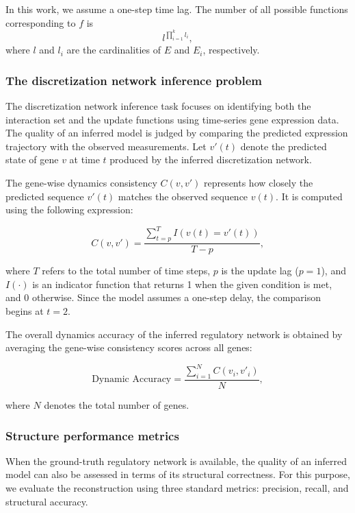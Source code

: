 In this work, we assume a one-step time lag. The number of all possible functions corresponding to \( f \) is 
\[
l^{\prod_{i=1}^{k} l_i},
\] 
where \( l \) and \( l_i \) are the cardinalities of \( E \) and \( E_i \), respectively.



\subsubsection{The discretization network inference problem}

The discretization network inference task focuses on identifying both the interaction set and the update functions using time-series gene expression data. The quality of an inferred model is judged by comparing the predicted expression trajectory with the observed measurements. Let \( v'(t) \) denote the predicted state of gene \( v \) at time \( t \) produced by the inferred discretization network.

The gene-wise dynamics consistency \( C(v, v') \) represents how closely the predicted sequence \( v'(t) \) matches the observed sequence \( v(t) \). It is computed using the following expression:

\[
C(v, v') = \frac{\sum_{t=p}^{T} I(v(t) = v'(t))}{T - p},
\]

where \( T \) refers to the total number of time steps, \( p \) is the update lag (\( p = 1 \)), and \( I(\cdot) \) is an indicator function that returns 1 when the given condition is met, and 0 otherwise. Since the model assumes a one-step delay, the comparison begins at \( t = 2 \).

The overall dynamics accuracy of the inferred regulatory network is obtained by averaging the gene-wise consistency scores across all genes:

\[
\text{Dynamic Accuracy} = \frac{\sum_{i=1}^{N} C(v_i, v'_i)}{N},
\]

where \( N \) denotes the total number of genes.


\subsubsection{Structure performance metrics}

When the ground-truth regulatory network is available, the quality of an inferred model can also be assessed in terms of its structural correctness. For this purpose, we evaluate the reconstruction using three standard metrics: precision, recall, and structural accuracy.

